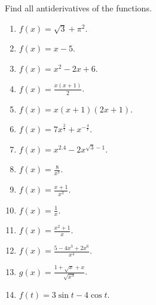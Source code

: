 Find all antiderivatives of the functions.
\begin{multicols}{3}
\begin{enumerate}[ref={\fcProblemRef}]
\item $\displaystyle f(x)=\sqrt {3}+\pi^2$.

\item $\displaystyle f(x)=x-5$.


\item $\displaystyle f(x)= x^2-2x+6$.


\item $\displaystyle f(x)=\frac{x(x+1)}{2} $.

\item $\displaystyle f(x)=x(x+1)(2x+1)$.

\item $\displaystyle f(x)=7x^{\frac{2}{7}}+x^{-\frac{4}{7}}$.

\item $\displaystyle f(x)=x^{2.4}-2x^{\sqrt{3}-1}$.

\item $\displaystyle f(x)=\frac{8}{x^7}$.

\item $\displaystyle f(x)=\frac{x+1}{x^3}$.

\item $\displaystyle f(x)=\frac{1}{x}$.

\item $\displaystyle f(x)=\frac{x^2+1}{x}$.

\item $\displaystyle f(x)=\frac{5-4x^3+2x^6}{x^4}$.

\item $\displaystyle g(x)=\frac{1+\sqrt{x}+x}{\sqrt{x^3}}$.

\item $\displaystyle f(t)=3\sin t-4\cos t$.


\end{enumerate}
\end{multicols}
